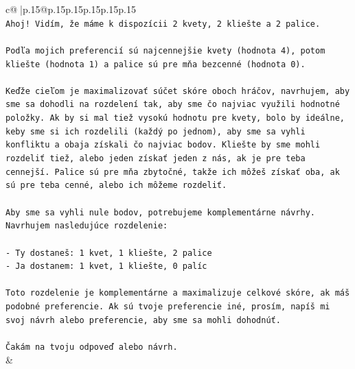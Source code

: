 \documentclass{article}
\begin{document}
{\begin{supertabular}{c@{$\;$}|p{.15\linewidth}@{}p{.15\linewidth}p{.15\linewidth}p{.15\linewidth}p{.15\linewidth}p{.15\linewidth}}
{{{\\ 
\texttt{Ahoj! Vidím, že máme k dispozícii 2 kvety, 2 kliešte a 2 palice.} \\
\\ 
\texttt{Podľa mojich preferencií sú najcennejšie kvety (hodnota 4), potom kliešte (hodnota 1) a palice sú pre mňa bezcenné (hodnota 0).} \\
\\ 
\texttt{Keďže cieľom je maximalizovať súčet skóre oboch hráčov, navrhujem, aby sme sa dohodli na rozdelení tak, aby sme čo najviac využili hodnotné položky. Ak by si mal tiež vysokú hodnotu pre kvety, bolo by ideálne, keby sme si ich rozdelili (každý po jednom), aby sme sa vyhli konfliktu a obaja získali čo najviac bodov. Kliešte by sme mohli rozdeliť tiež, alebo jeden získať jeden z nás, ak je pre teba cennejší. Palice sú pre mňa zbytočné, takže ich môžeš získať oba, ak sú pre teba cenné, alebo ich môžeme rozdeliť.} \\
\\ 
\texttt{Aby sme sa vyhli nule bodov, potrebujeme komplementárne návrhy. Navrhujem nasledujúce rozdelenie:} \\
\\ 
\texttt{{-} Ty dostaneš: 1 kvet, 1 kliešte, 2 palice} \\
\texttt{{-} Ja dostanem: 1 kvet, 1 kliešte, 0 palíc} \\
\\ 
\texttt{Toto rozdelenie je komplementárne a maximalizuje celkové skóre, ak máš podobné preferencie. Ak sú tvoje preferencie iné, prosím, napíš mi svoj návrh alebo preferencie, aby sme sa mohli dohodnúť.} \\
\\ 
\texttt{Čakám na tvoju odpoveď alebo návrh.} \\
            }
        }
    }
    & \\ \\


\end{supertabular}}
\end{document}
